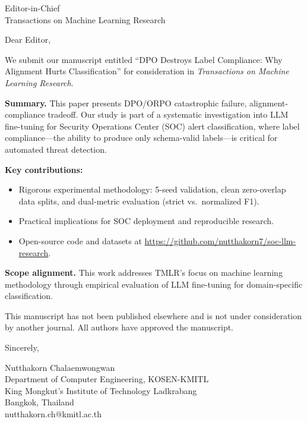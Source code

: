\documentclass[11pt]{letter}
\begin{document}
\begin{letter}{Editor-in-Chief \\ Transactions on Machine Learning Research}

\opening{Dear Editor,}

We submit our manuscript entitled ``DPO Destroys Label Compliance: Why Alignment Hurts Classification'' for consideration in \textit{Transactions on Machine Learning Research}.

\textbf{Summary.} This paper presents DPO/ORPO catastrophic failure, alignment-compliance tradeoff. Our study is part of a systematic investigation into LLM fine-tuning for Security Operations Center (SOC) alert classification, where label compliance---the ability to produce only schema-valid labels---is critical for automated threat detection.

\textbf{Key contributions:}
\begin{itemize}
\item Rigorous experimental methodology: 5-seed validation, clean zero-overlap data splits, and dual-metric evaluation (strict vs.\ normalized F1).
\item Practical implications for SOC deployment and reproducible research.
\item Open-source code and datasets at \url{https://github.com/nutthakorn7/soc-llm-research}.
\end{itemize}

\textbf{Scope alignment.} This work addresses TMLR's focus on machine learning methodology through empirical evaluation of LLM fine-tuning for domain-specific classification.

This manuscript has not been published elsewhere and is not under consideration by another journal. All authors have approved the manuscript.

\closing{Sincerely,}

Nutthakorn Chalaemwongwan \\
Department of Computer Engineering, KOSEN-KMITL \\
King Mongkut's Institute of Technology Ladkrabang \\
Bangkok, Thailand \\
nutthakorn.ch@kmitl.ac.th

\end{letter}
\end{document}
